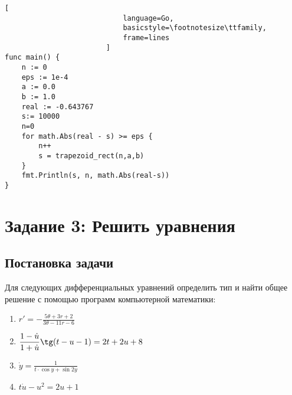 \documentclass[14pt, a4paper, titlepage, fleqn]{extarticle}
\begin{document}
\begin{enumerate}
\begin{lstlisting}[
                            language=Go,
                            basicstyle=\footnotesize\ttfamily,
                            frame=lines
                        ]
func main() {
    n := 0
    eps := 1e-4
    a := 0.0
    b := 1.0
    real := -0.643767
    s:= 10000
    n=0
    for math.Abs(real - s) >= eps {
        n++
        s = trapezoid_rect(n,a,b)
    }
    fmt.Println(s, n, math.Abs(real-s))
}
                \end{lstlisting}
            \end{enumerate}

    \pagebreak

    \section{Задание 3: Решить уравнения}
        \subsection{Постановка задачи}
            Для следующих дифференциальных уравнений определить тип и найти
            общее решение с помощью программ компьютерной математики:
            \begin{enumerate}
                \item \( 
                        \displaystyle  
                        r' = -\frac{5\theta + 3r + 2}{3\theta -11r-6} 
                    \)

                \item \( 
                        \displaystyle  
                        \frac{1-\dot{u}}{1+\dot{u}} \tg (t-u-1) = 2t+2u+8 
                    \)

                \item \( 
                        \displaystyle  
                        \dot{y} = \frac{1}{t \cdot \cos{y} + \sin{2y}} 
                    \)
                
                \item \( t \dot{u} - u^2 = 2u + 1 \)
            \end{enumerate}
\end{document}
